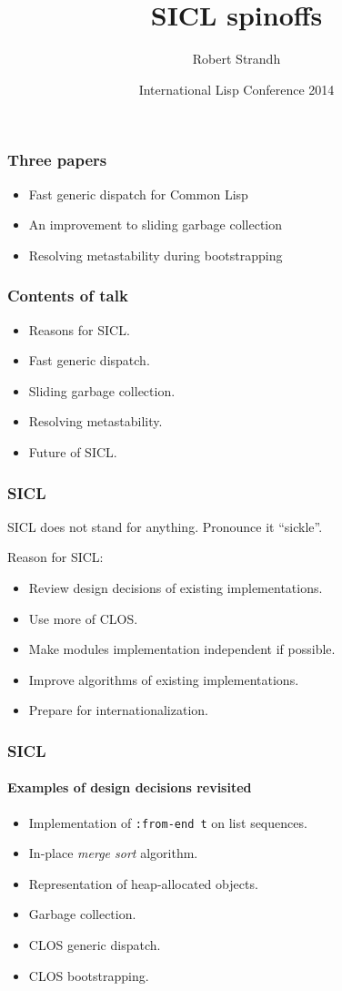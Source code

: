 \documentclass{beamer}
\title{SICL spinoffs}
\author{Robert Strandh\inst{1}}
\institute{\inst{1}Université de Bordeaux}
\date[ILC 2014]{International Lisp Conference 2014}
\begin{document}
\begin{frame}
  \titlepage
\end{frame}
\begin{frame}
  \frametitle{Three papers}

  \begin{itemize}
  \item Fast generic dispatch for Common Lisp
  \item An improvement to sliding garbage collection
  \item Resolving metastability during bootstrapping
  \end{itemize}
\end{frame}
\begin{frame}
  \frametitle{Contents of talk}

  \begin{itemize}
  \item Reasons for SICL.
  \item Fast generic dispatch.
  \item Sliding garbage collection.
  \item Resolving metastability.
  \item Future of SICL.
  \end{itemize}
\end{frame}
\begin{frame}
  \frametitle{SICL}

  SICL does not stand for anything.  Pronounce it ``sickle''.

  Reason for SICL:
  
  \begin{itemize}
  \item Review design decisions of existing implementations.
  \item Use more of CLOS.
  \item Make modules implementation independent if possible.
  \item Improve algorithms of existing implementations. 
  \item Prepare for internationalization. 
  \end{itemize}
\end{frame}
\begin{frame}
  \frametitle{SICL}
  \framesubtitle{Examples of design decisions revisited}

  \begin{itemize}
  \item Implementation of \texttt{:from-end t} on list sequences.
  \item In-place \emph{merge sort} algorithm. 
  \item Representation of heap-allocated objects.
  \item Garbage collection.
  \item CLOS generic dispatch.
  \item CLOS bootstrapping.
  \end{itemize}
\end{frame}
\end{document}
